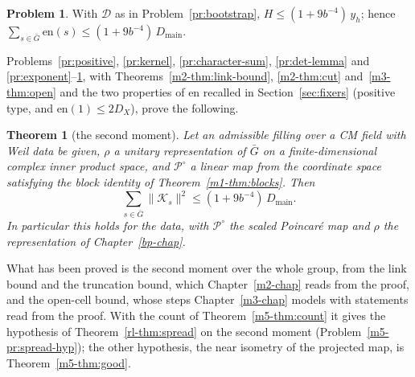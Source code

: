 \documentclass[reqno]{amsart}
\newcounter{chap}
\theoremstyle{definition}
\newtheorem{problem}{Problem}[section]
\theoremstyle{plain}
\newtheorem{theorem}{Theorem}[section]
\theoremstyle{remark}
\newcommand{\Gb}{\bar G}
\newcommand{\Pco}{{\mathcal P^\circ}}
\newcommand{\Kc}{\mathcal K}
\newcommand{\Dc}{\mathcal D}
\newcommand{\en}{\mathrm{en}}
\newcommand{\Dmain}{D_{\mathrm{main}}}
\begin{document}
\begin{problem}\label{pr:whole}
With \(\Dc\) as in Problem~\ref{pr:bootstrap}, \(H\le(1+9b^{-4})\,y_h\); hence \(\sum_{s\in\Gb}\en(s)\le(1+9b^{-4})\,\Dmain\).
\end{problem}

Problems~\ref{pr:positive}, \ref{pr:kernel}, \ref{pr:character-sum}, \ref{pr:det-lemma} and \ref{pr:exponent}--\ref{pr:whole}, with Theorems~\ref{m2-thm:link-bound}, \ref{m2-thm:cut} and~\ref{m3-thm:open} and the two properties of \(\en\) recalled in Section~\ref{sec:fixers} (positive type, and \(\en(1)\le2D_X\)), prove the following.

\begin{theorem}[the second moment]\label{thm:second-moment}
Let an admissible filling over a CM field with Weil data be given, \(\rho\) a unitary representation of \(\Gb\) on a finite-dimensional complex inner product space, and \(\Pco\) a linear map from the coordinate space satisfying the block identity of Theorem~\ref{m1-thm:blocks}.  Then
\[
 \sum_{s\in\Gb}\lVert\Kc_s\rVert^2\le(1+9b^{-4})\,\Dmain .
\]
In particular this holds for the data, with \(\Pco\) the scaled Poincar\'e map and \(\rho\) the representation of Chapter~\ref{bp-chap}.
\end{theorem}

What has been proved is the second moment over the whole group, from the link bound and the truncation bound, which Chapter~\ref{m2-chap} reads from the proof, and the open-cell bound, whose steps Chapter~\ref{m3-chap} models with statements read from the proof.  With the count of Theorem~\ref{m5-thm:count} it gives the hypothesis of Theorem~\ref{rl-thm:spread} on the second moment (Problem~\ref{m5-pr:spread-hyp}); the other hypothesis, the near isometry of the projected map, is Theorem~\ref{m5-thm:good}.
\end{document}
